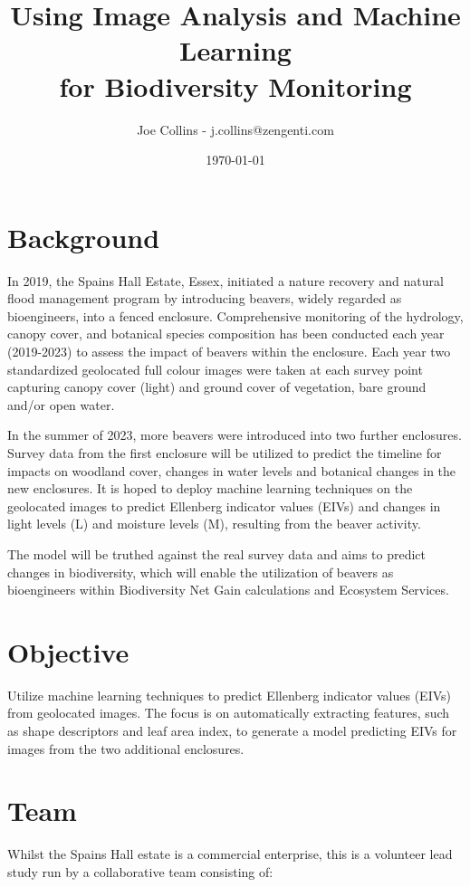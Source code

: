 \documentclass[12pt]{article}
\title{Using Image Analysis and Machine Learning\\for Biodiversity Monitoring}
\author{Joe Collins - j.collins@zengenti.com}
\date{\today}
\begin{document}
\maketitle

\section*{Background}

In 2019, the Spains Hall Estate, Essex,
initiated a nature recovery and natural flood management program by introducing beavers, widely regarded as bioengineers,
into a fenced enclosure.
Comprehensive monitoring of the hydrology, canopy cover, and botanical species composition has been conducted
each year (2019-2023) to assess the impact of beavers within the enclosure.
Each year two standardized geolocated full colour images were taken at each survey point
capturing canopy cover (light) and ground cover of vegetation,
bare ground and/or open water.

In the summer of 2023, more beavers were introduced into two further enclosures.
Survey data from the first enclosure will be utilized
to predict the timeline for impacts on woodland cover, changes in water levels and botanical changes in the new enclosures.
It is hoped to deploy machine learning techniques on the geolocated images
to predict Ellenberg indicator values (EIVs) and changes in light levels (L) and moisture levels (M), resulting from the beaver activity.

The model will be truthed against the real survey data and aims to predict changes in biodiversity,
which will enable the utilization of beavers as bioengineers within Biodiversity Net Gain calculations and Ecosystem Services. 

\section*{Objective}

Utilize machine learning techniques to predict Ellenberg indicator values (EIVs)
from geolocated images.
The focus is on automatically extracting features,
such as shape descriptors and leaf area index,
to generate a model predicting EIVs for images from the two additional enclosures.

\section*{Team}

Whilst the Spains Hall estate is a commercial enterprise,
this is a volunteer lead study
run by a collaborative team consisting of:
\end{document}
